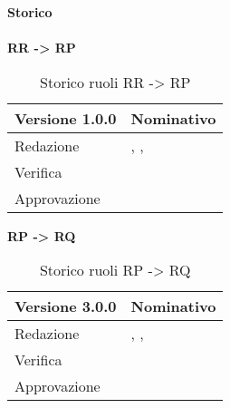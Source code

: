 \newpage
\Large{\textbf{Storico }}\\
\normalsize \\

\textbf{RR -> RP}
\label{tabVers1}
\begin{table}[h]
	\begin{tabular}{p{} p{}}
		\toprule \textbf{Versione 1.0.0}	&	\textbf{Nominativo}\\
		\midrule Redazione	& \FM, \TP, \VG\\
		\midrule Verifica &	\GP\\
		\midrule Approvazione	& \PM\\
		\bottomrule
	\end{tabular}
	\caption{Storico ruoli RR -> RP}
\end{table}

\textbf{RP -> RQ}
\label{tabVers2}
\begin{table}[h]
	\begin{tabular}{p{} p{}}
		\toprule \textbf{Versione 3.0.0}	&	\textbf{Nominativo}\\
		\midrule Redazione	&  \BM, \TP, \PM\\
		\midrule Verifica &	\VG\\
		\midrule Approvazione	& \BM\\
		\bottomrule
	\end{tabular}
	\caption{Storico ruoli RP -> RQ}
\end{table}